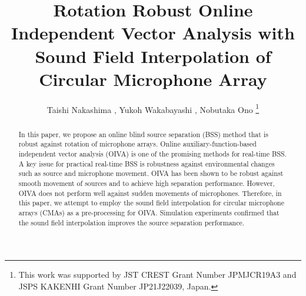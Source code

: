 \documentclass[twocolumn,9pt,dvipdfmx]{article}
\title{Rotation Robust Online Independent Vector Analysis with\\Sound Field Interpolation of Circular Microphone Array}
\author{%
  Taishi Nakashima \textsuperscript{\textdagger},
  Yukoh Wakabayashi \textsuperscript{\textdaggerdbl},
  Nobutaka Ono \textsuperscript{\textdagger}
  \thanks{This work was supported by JST CREST Grant Number \mbox{JPMJCR19A3} and JSPS KAKENHI Grant Number \mbox{JP21J22039}, Japan.}
}
\begin{document}
\maketitle

\begin{abstract}
  In this paper, we propose an online blind source separation (BSS) method that is robust against rotation of microphone arrays.
  Online auxiliary-function-based independent vector analysis (OIVA) is one of the promising methods for real-time BSS.
  A key issue for practical real-time BSS is robustness against environmental changes such as source and microphone movement.
  OIVA has been shown to be robust against smooth movement of sources and to achieve high separation performance.
  However, OIVA does not perform well against sudden movements of microphones.
  Therefore, in this paper, we attempt to employ the sound field interpolation for circular microphone arrays (CMAs) as a pre-processing for OIVA.
  Simulation experiments confirmed that the sound field interpolation improves the source separation performance.
\end{abstract}
\end{document}

